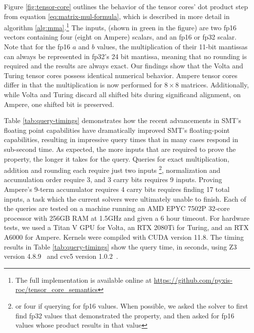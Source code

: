 Figure \ref{fig:tensor-core} outlines the behavior of the tensor cores' dot product step from equation \ref{eq:matrix-mul-formula}, which is described in more detail in algorithm \ref{alg:mma}.\footnote{The full implementation is available online at \url{https://github.com/pyxis-roc/tensor\_core\_semantics}} The inputs, (shown in green in the figure) are two fp16 vectors containing four (eight on Ampere) scalars, and an fp16 or fp32 scalar. Note that for the fp16 $a$ and $b$ values, the multiplication of their 11-bit mantissas can always be represented in fp32's 24 bit mantissa, meaning that no rounding is required and the results are always exact. Our findings show that the Volta and Turing tensor cores possess identical numerical behavior. Ampere tensor cores differ in that the multiplication is now performed for $8\times8$ matrices. Additionally, while Volta and Turing discard all shifted bits during significand alignment, on Ampere, one shifted bit is preserved.

Table \ref{tab:query-timings} demonstrates how the recent advancements in SMT's floating point capabilities have dramatically improved SMT's floating-point capabilities, resulting in impressive query times that in many cases respond in sub-second time. As expected, the more inputs that are required to prove the property, the longer it takes for the query. Queries for exact multiplication, addition and rounding each require just two inputs
\footnote{or four if querying for fp16 values. When possible, we asked the solver to first find fp32 values that demonstrated the property, and then asked for fp16 values whose product results in that value},
normalization and accumulation order require 3, and 3 carry bits requires 9 inputs. Proving Ampere's 9-term accumulator requires 4 carry bits requires finding 17 total inputs, a task which the current solvers were ultimately unable to finish.
Each of the queries are tested on a machine running an AMD EPYC 7502P 32-core processor with 256GB RAM at 1.5GHz and given a 6 hour timeout. For hardware tests, we used a Titan V GPU for Volta, an RTX 2080Ti for Turing, and an RTX A6000 for Ampere. Kernels were compiled with CUDA version 11.8. The timing results in Table \ref{tab:query-timings} show the query time, in seconds, using Z3 version 4.8.9~\cite{de_moura_z3_2008} and cvc5 version 1.0.2~\cite{cvc5}.
